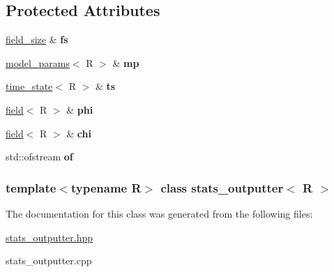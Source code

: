 \subsection*{Protected Attributes}
\begin{DoxyCompactItemize}
\item 
\hypertarget{classstats__outputter_af1df1f462b7fa0b4ddf88ba3a610a5ad}{
\hyperlink{structfield__size}{field\_\-size} \& {\bfseries fs}}
\label{classstats__outputter_af1df1f462b7fa0b4ddf88ba3a610a5ad}

\item 
\hypertarget{classstats__outputter_a57040b1bf054e48394617dfb264c14d6}{
\hyperlink{structmodel__params}{model\_\-params}$<$ R $>$ \& {\bfseries mp}}
\label{classstats__outputter_a57040b1bf054e48394617dfb264c14d6}

\item 
\hypertarget{classstats__outputter_a0521e1c35bb5acadb4ce78c6b5636122}{
\hyperlink{structtime__state}{time\_\-state}$<$ R $>$ \& {\bfseries ts}}
\label{classstats__outputter_a0521e1c35bb5acadb4ce78c6b5636122}

\item 
\hypertarget{classstats__outputter_a0f99351a3034982104841cb09e7564da}{
\hyperlink{classfield}{field}$<$ R $>$ \& {\bfseries phi}}
\label{classstats__outputter_a0f99351a3034982104841cb09e7564da}

\item 
\hypertarget{classstats__outputter_a682704aa2c6cc2f8be5365bc5feabafe}{
\hyperlink{classfield}{field}$<$ R $>$ \& {\bfseries chi}}
\label{classstats__outputter_a682704aa2c6cc2f8be5365bc5feabafe}

\item 
\hypertarget{classstats__outputter_a918c79e8ec6dbcffee8d10ac5a79db41}{
std::ofstream {\bfseries of}}
\label{classstats__outputter_a918c79e8ec6dbcffee8d10ac5a79db41}

\end{DoxyCompactItemize}
\subsubsection*{template$<$typename R$>$ class stats\_\-outputter$<$ R $>$}



The documentation for this class was generated from the following files:\begin{DoxyCompactItemize}
\item 
\hyperlink{stats__outputter_8hpp}{stats\_\-outputter.hpp}\item 
stats\_\-outputter.cpp\end{DoxyCompactItemize}
